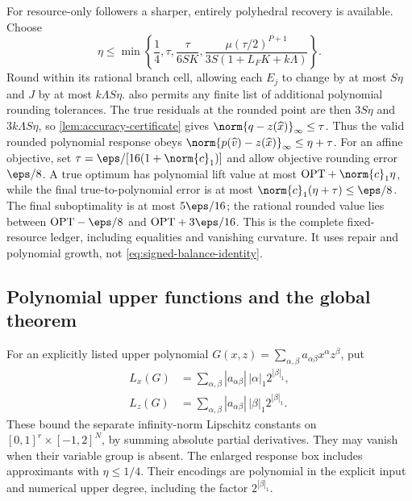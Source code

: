 For resource-only followers a sharper, entirely polyhedral recovery
is available. Choose
\begin{equation}\label{eq:accuracy-resource-tolerance}
 \eta\le\min\left\{\frac14,\tau,\frac{\tau}{6SK},
 \frac{\mu(\tau/2)^{P+1}}{3S(1+L_FK+k\Lambda)}\right\}.
\end{equation}
Round within its rational branch cell, allowing each $E_j$ to change
by at most $S\eta$ and $J$ by at most $k\Lambda S\eta$.
 also permits any finite list of additional
polynomial rounding tolerances. The true residuals at the rounded
point are then $3S\eta$ and $3k\Lambda S\eta$, so
\cref{lem:accuracy-certificate} gives $\norm{q-z(\widehat x)}_\infty\le\tau$.
Thus the valid rounded polynomial response obeys
$\norm{p(\widehat v)-z(\widehat x)}_\infty\le\eta+\tau$.
For an affine objective, set $\tau=\eps/[16(1+\norm{c}_1)]$ and
allow objective rounding error $\eps/8$. A true optimum has polynomial
lift value at most $\mathrm{OPT}+\norm{c}_1\eta$, while the final
true-to-polynomial error is at most
$\norm{c}_1(\eta+\tau)\le\eps/8$.
The final suboptimality is at most $5\eps/16$; the rational rounded
value lies between $\mathrm{OPT}-\eps/8$ and
$\mathrm{OPT}+3\eps/16$. This is the complete fixed-resource
ledger, including equalities and vanishing curvature. It uses repair
and polynomial growth, not \eqref{eq:signed-balance-identity}.

\subsection{Polynomial upper functions and the global theorem}
\label{subsec:accuracy-polynomial-upper}

For an explicitly listed upper polynomial
$G(x,z)=\sum_{\alpha,\beta}a_{\alpha\beta}x^\alpha z^\beta$, put
\begin{equation}\label{eq:upper-polynomial-lipschitz}
 \begin{split}
 L_x(G)&=\sum_{\alpha,\beta}|a_{\alpha\beta}|\,|\alpha|_1
                                                        2^{|\beta|_1},\\
 L_z(G)&=\sum_{\alpha,\beta}|a_{\alpha\beta}|\,|\beta|_1
                                                        2^{|\beta|_1}.
 \end{split}
\end{equation}
These bound the separate infinity-norm Lipschitz constants on
$[0,1]^r\times[-1,2]^N$, by summing absolute partial derivatives.
They may vanish when their variable group is absent. The enlarged
response box includes approximants with $\eta\le1/4$.
Their encodings are polynomial in the explicit input and numerical
upper degree, including the factor $2^{|\beta|_1}$.

